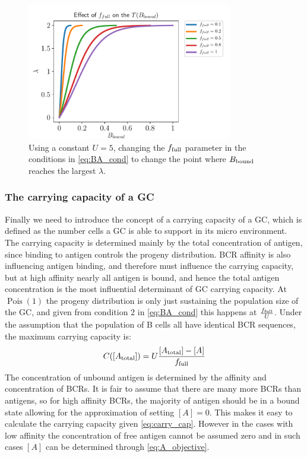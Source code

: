 \begin{figure}
    \centering
    \includegraphics[width=0.8\textwidth]{figures/T_Bbound_f_full.pdf}
    \caption{
        \label{fig:T_Bbound_f_full}
        Using a constant $U = 5$, changing the $f_{\text{full}}$ parameter in the conditions in \eqref{eq:BA_cond} to change the point where $B_{\text{bound}}$ reaches the largest $\lambda$.
    }
\end{figure}








\subsubsection{The carrying capacity of a GC}
Finally we need to introduce the concept of a carrying capacity of a GC, which is defined as the number cells a GC is able to support in its micro environment.
The carrying capacity is determined mainly by the total concentration of antigen, since binding to antigen controls the progeny distribution.
BCR affinity is also influencing antigen binding, and therefore must influence the carrying capacity, but at high affinity nearly all antigen is bound, and hence the total antigen concentration is the most influential determinant of GC carrying capacity.
At $\operatorname{Pois}(1)$ the progeny distribution is only just sustaining the population size of the GC, and given from condition 2 in \eqref{eq:BA_cond} this happens at $\frac{f_{\text{full}}}{U}$.
Under the assumption that the population of B cells all have identical BCR sequences, the maximum carrying capacity is:
\begin{equation}
C([A_{\text{total}}]) = U \frac{[A_{\text{total}}] - [A]}{f_{\text{full}}}
  \label{eq:carry_cap}
\end{equation}
The concentration of unbound antigen is determined by the affinity and concentration of BCRs.
It is fair to assume that there are many more BCRs than antigens, so for high affinity BCRs, the majority of antigen should be in a bound state allowing for the approximation of setting $[A]=0$.
This makes it easy to calculate the carrying capacity given \eqref{eq:carry_cap}.
However in the cases with low affinity the concentration of free antigen cannot be assumed zero and in such cases $[A]$ can be determined through \eqref{eq:A_objective}.

